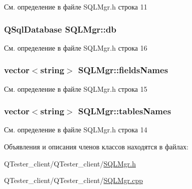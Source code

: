См. определение в файле S\+Q\+L\+Mgr.\+h строка 11

\hypertarget{class_s_q_l_mgr_a1a950b08b5dc3003ccc164c4f99f5bfd}{}
\subsubsection[{db}]{\setlength{\rightskip}{0pt plus 5cm}Q\+Sql\+Database S\+Q\+L\+Mgr\+::db\hspace{0.3cm}{\ttfamily [protected]}}\label{class_s_q_l_mgr_a1a950b08b5dc3003ccc164c4f99f5bfd}


См. определение в файле S\+Q\+L\+Mgr.\+h строка 16

\hypertarget{class_s_q_l_mgr_a299770e5179d462454a5f343d5b378a2}{}
\subsubsection[{fields\+Names}]{\setlength{\rightskip}{0pt plus 5cm}vector$<$string$>$ S\+Q\+L\+Mgr\+::fields\+Names\hspace{0.3cm}{\ttfamily [protected]}}\label{class_s_q_l_mgr_a299770e5179d462454a5f343d5b378a2}


См. определение в файле S\+Q\+L\+Mgr.\+h строка 15

\hypertarget{class_s_q_l_mgr_ad12619899cd1b12450134f2ecc2ba56c}{}
\subsubsection[{tables\+Names}]{\setlength{\rightskip}{0pt plus 5cm}vector$<$string$>$ S\+Q\+L\+Mgr\+::tables\+Names\hspace{0.3cm}{\ttfamily [protected]}}\label{class_s_q_l_mgr_ad12619899cd1b12450134f2ecc2ba56c}


См. определение в файле S\+Q\+L\+Mgr.\+h строка 14



Объявления и описания членов классов находятся в файлах\+:\begin{DoxyCompactItemize}
\item 
Q\+Tester\+\_\+client/\+Q\+Tester\+\_\+client/\hyperlink{_s_q_l_mgr_8h}{S\+Q\+L\+Mgr.\+h}\item 
Q\+Tester\+\_\+client/\+Q\+Tester\+\_\+client/\hyperlink{_s_q_l_mgr_8cpp}{S\+Q\+L\+Mgr.\+cpp}\end{DoxyCompactItemize}

